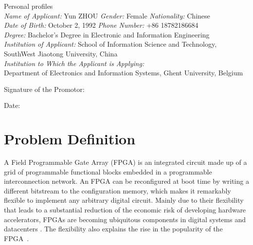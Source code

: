 \documentclass[a4paper,oneside,12pt]{article}
\begin{document}
\vspace{5mm}
\begin{description*}

\item[Personal profiles]\ \\

\emph{Name of Applicant:} Yun ZHOU
\hspace{10mm}\emph{Gender:} Female
\hspace{10mm}\emph{Nationality:} Chinese\\
\emph{Date of Birth:} October 2, 1992
\hspace{13mm}\emph{Phone Number:} +86 18782186684\\
\emph{Degree:} Bachelor's Degree in Electronic and Information Engineering\\
\emph{Institution of Applicant:} School of Information Science and Technology, SouthWest Jiaotong University, China\\
\emph{Institution to Which the Applicant is Applying:}\\
Department of Electronics and Information Systems, Ghent University, Belgium
\end{description*}
\begin{description*}
\item[Signature of the Promotor:]\ \\
\item[Date:]\
\end{description*}
\clearpage

\section{Problem Definition}
A Field Programmable Gate Array (FPGA) is an integrated circuit made up of a grid of programmable functional blocks embedded in a programmable interconnection network. An FPGA can be reconfigured  at boot time by writing a different bitstream to the configuration memory, which makes it remarkably flexible to implement any arbitrary digital circuit.
Mainly due to their flexibility that leads to a substantial reduction of the economic risk of developing hardware accelerators, FPGAs are becoming ubiquitous components in digital systems and datacenters \cite{ovtcharov2015accelerating,putnam2015reconfigurable}. The flexibility also explains the rise in the popularity of the FPGA~\cite{putnam2015reconfigurable}.
\end{document}
